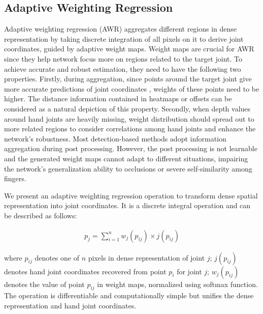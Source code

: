 \documentclass[letterpaper]{article} \usepackage{aaai20}  \usepackage{times}  \usepackage{helvet} \usepackage{courier}  \usepackage[hyphens]{url}  \usepackage{graphicx} \usepackage{amsmath}
\begin{document}
\subsection{Adaptive Weighting Regression}
Adaptive weighting regression (AWR) aggregates different regions in dense representation by taking discrete integration of all pixels on it to derive joint coordinates, guided by adaptive weight maps. Weight maps are crucial for AWR since they help network focus more on regions related to the target joint. To achieve accurate and robust estimation, they need to have the following two properties. Firstly, during aggregation, since points around the target joint give more accurate predictions of joint coordinates \cite{point2pose}, weights of these points need to be higher. The distance information contained in heatmaps or offsets can be considered as a natural depiction of this property. Secondly, when depth values around hand joints are heavily missing, weight distribution should spread out to more related regions to consider correlations among hand joints and enhance the network's robustness. Most detection-based methods adopt information aggregation during post processing. However, the post processing is not learnable and the generated weight maps cannot adapt to different situations, impairing the network's generalization ability to occlusions or severe self-similarity among fingers. 

\parskip=0pt

We present an adaptive weighting regression operation to transform dense spatial representation into joint coordinates. It is a discrete integral operation and can be described as follows:

\parskip=0pt

\begin{small}
\begin{equation}
\begin{aligned}
p_j = \sum_{i=1}^{n}w_j(p_{ij})\times j(p_{ij})
\end{aligned}
\end{equation}
\end{small}

\noindent where $p_{ij}$ denotes one of $n$ pixels in dense representation of joint $j$; $j(p_{ij})$ denotes hand joint coordinates recovered from point $p_i$ for joint $j$; $w_j(p_{ij})$ denotes the value of point $p_{ij}$ in weight maps, normalized using softmax function. The operation is differentiable and computationally simple but unifies the dense representation and hand joint coordinates.
\end{document}
